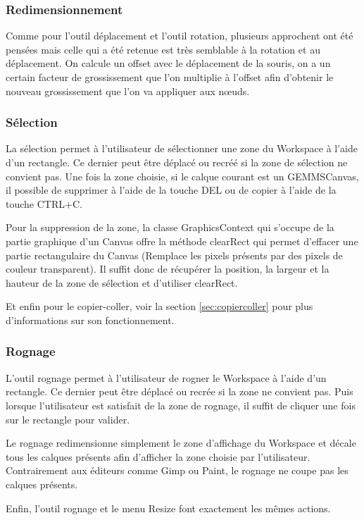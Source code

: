\subsubsection{Redimensionnement}
Comme pour l'outil déplacement et l'outil rotation, plusieurs approchent ont été pensées mais celle qui a été retenue est très semblable à la rotation et au déplacement. On calcule un offset avec le déplacement de la souris, on a un certain facteur de grossissement que l'on multiplie à l'offset afin d'obtenir le nouveau grossissement que l'on va appliquer aux n\oe uds.
\subsubsection{Sélection}
\label{sec:selection}
La sélection permet à l'utilisateur de sélectionner une zone du Workspace à l'aide d'un rectangle. Ce dernier peut être déplacé ou recréé si la zone de sélection ne convient pas. Une fois la zone choisie, si le calque courant est un GEMMSCanvas, il possible de supprimer à l'aide de la touche DEL ou de copier à l'aide de la touche CTRL+C.

Pour la suppression de la zone, la classe GraphicsContext qui s'occupe de la partie graphique d'un Canvas offre la méthode clearRect qui permet d'effacer une partie rectangulaire du Canvas (Remplace les pixels présents par des pixels de couleur transparent). Il suffit donc de récupérer la position, la largeur et la hauteur de la zone de sélection et d'utiliser clearRect.

Et enfin pour le copier-coller, voir la section \ref{sec:copiercoller} pour plus d'informations sur son fonctionnement.

\subsubsection{Rognage}
L'outil rognage permet à l'utilisateur de rogner le Workspace à l'aide d'un rectangle. Ce dernier peut être déplacé ou recrée si la zone ne convient pas. Puis lorsque l'utilisateur est satisfait de la zone de rognage, il suffit de cliquer une fois sur le rectangle pour valider.

Le rognage redimensionne simplement le zone d'affichage du Workspace et décale tous les calques présents afin d'afficher la zone choisie par l'utilisateur. Contrairement aux éditeurs comme Gimp ou Paint, le rognage ne coupe pas les calques présents.

Enfin, l'outil rognage et le menu Resize font exactement les mêmes actions.

